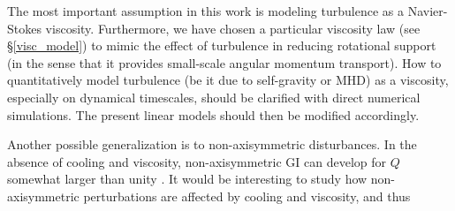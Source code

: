 The most important assumption in this work is modeling turbulence as a  
Navier-Stokes viscosity. Furthermore, we have chosen a particular  
viscosity law (see \S\ref{visc_model}) to mimic the effect of 
turbulence in reducing rotational support (in the sense that it
provides small-scale angular momentum transport). 
How to quantitatively model turbulence (be it due to self-gravity or
MHD) as a viscosity, especially on dynamical timescales, should be
clarified with direct numerical simulations. The present linear models
should then be modified accordingly. 

Another possible generalization is to non-axisymmetric
disturbances. In the absence of cooling and viscosity, 
non-axisymmetric GI can develop for $Q$ somewhat larger than unity
\citep{papaloizou89,papaloizou91}. It would be interesting to study
how non-axisymmetric perturbations are affected by cooling and
viscosity, and thus    


